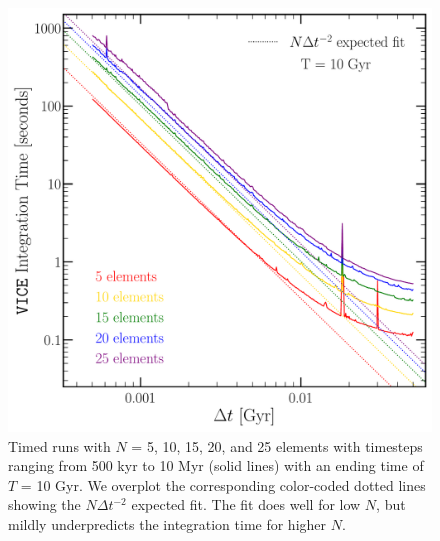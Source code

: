 \documentclass{report}
\begin{document}
\begin{figure} 
\centering
\includegraphics[scale = 0.4]{vice_timer.pdf}
\caption{Timed runs with $N$ = 5, 10, 15, 20, and 25 elements with timesteps 
ranging from 500 kyr to 10 Myr (solid lines) with an ending time of 
$T$ = 10 Gyr. We overplot the corresponding color-coded dotted lines showing 
the $N\Delta t^{-2}$ expected fit. The fit does well for low $N$, but 
mildly underpredicts the integration time for higher $N$. }
\label{fig:timer}
\end{figure} 




\end{document}
